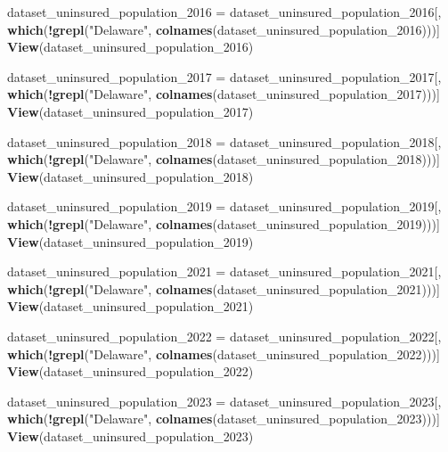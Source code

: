 \documentclass[
]{article}
\newenvironment{Shaded}{\begin{snugshade}}{\end{snugshade}}
\newcommand{\FunctionTok}[1]{\textcolor[rgb]{0.13,0.29,0.53}{\textbf{#1}}}
\newcommand{\NormalTok}[1]{#1}
\newcommand{\OtherTok}[1]{\textcolor[rgb]{0.56,0.35,0.01}{#1}}
\newcommand{\SpecialCharTok}[1]{\textcolor[rgb]{0.81,0.36,0.00}{\textbf{#1}}}
\newcommand{\StringTok}[1]{\textcolor[rgb]{0.31,0.60,0.02}{#1}}
\begin{document}
\begin{Shaded}
\begin{Highlighting}[]
\NormalTok{dataset\_uninsured\_population\_2016 }\OtherTok{=}\NormalTok{ dataset\_uninsured\_population\_2016[, }\FunctionTok{which}\NormalTok{(}\SpecialCharTok{!}\FunctionTok{grepl}\NormalTok{(}\StringTok{"Delaware"}\NormalTok{, }\FunctionTok{colnames}\NormalTok{(dataset\_uninsured\_population\_2016)))]}
\FunctionTok{View}\NormalTok{(dataset\_uninsured\_population\_2016)}

\NormalTok{dataset\_uninsured\_population\_2017 }\OtherTok{=}\NormalTok{ dataset\_uninsured\_population\_2017[, }\FunctionTok{which}\NormalTok{(}\SpecialCharTok{!}\FunctionTok{grepl}\NormalTok{(}\StringTok{"Delaware"}\NormalTok{, }\FunctionTok{colnames}\NormalTok{(dataset\_uninsured\_population\_2017)))]}
\FunctionTok{View}\NormalTok{(dataset\_uninsured\_population\_2017)}

\NormalTok{dataset\_uninsured\_population\_2018 }\OtherTok{=}\NormalTok{ dataset\_uninsured\_population\_2018[, }\FunctionTok{which}\NormalTok{(}\SpecialCharTok{!}\FunctionTok{grepl}\NormalTok{(}\StringTok{"Delaware"}\NormalTok{, }\FunctionTok{colnames}\NormalTok{(dataset\_uninsured\_population\_2018)))]}
\FunctionTok{View}\NormalTok{(dataset\_uninsured\_population\_2018)}

\NormalTok{dataset\_uninsured\_population\_2019 }\OtherTok{=}\NormalTok{ dataset\_uninsured\_population\_2019[, }\FunctionTok{which}\NormalTok{(}\SpecialCharTok{!}\FunctionTok{grepl}\NormalTok{(}\StringTok{"Delaware"}\NormalTok{, }\FunctionTok{colnames}\NormalTok{(dataset\_uninsured\_population\_2019)))]}
\FunctionTok{View}\NormalTok{(dataset\_uninsured\_population\_2019)}

\NormalTok{dataset\_uninsured\_population\_2021 }\OtherTok{=}\NormalTok{ dataset\_uninsured\_population\_2021[, }\FunctionTok{which}\NormalTok{(}\SpecialCharTok{!}\FunctionTok{grepl}\NormalTok{(}\StringTok{"Delaware"}\NormalTok{, }\FunctionTok{colnames}\NormalTok{(dataset\_uninsured\_population\_2021)))]}
\FunctionTok{View}\NormalTok{(dataset\_uninsured\_population\_2021)}

\NormalTok{dataset\_uninsured\_population\_2022 }\OtherTok{=}\NormalTok{ dataset\_uninsured\_population\_2022[, }\FunctionTok{which}\NormalTok{(}\SpecialCharTok{!}\FunctionTok{grepl}\NormalTok{(}\StringTok{"Delaware"}\NormalTok{, }\FunctionTok{colnames}\NormalTok{(dataset\_uninsured\_population\_2022)))]}
\FunctionTok{View}\NormalTok{(dataset\_uninsured\_population\_2022)}

\NormalTok{dataset\_uninsured\_population\_2023 }\OtherTok{=}\NormalTok{ dataset\_uninsured\_population\_2023[, }\FunctionTok{which}\NormalTok{(}\SpecialCharTok{!}\FunctionTok{grepl}\NormalTok{(}\StringTok{"Delaware"}\NormalTok{, }\FunctionTok{colnames}\NormalTok{(dataset\_uninsured\_population\_2023)))]}
\FunctionTok{View}\NormalTok{(dataset\_uninsured\_population\_2023)}


\end{Highlighting}
\end{Shaded}
\end{document}
